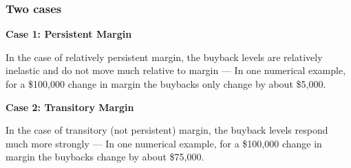 \documentclass[10pt]{beamer}
\begin{document}
  \begin{frame} \frametitle{Two cases}

    \textbf{Case 1: Persistent Margin}

    In the case of relatively persistent margin, the buyback levels are relatively inelastic and do
    not move much relative to margin --- In one numerical example, for a \$100,000 change in margin
    the buybacks only change by about \$5,000.

    \vspace{0.5cm}

    \textbf{Case 2: Transitory Margin}

    In the case of transitory (not persistent) margin, the buyback levels respond much more
    strongly --- In one numerical example, for a \$100,000 change in margin the buybacks change by
    about \$75,000.

  \end{frame}
\end{document}
